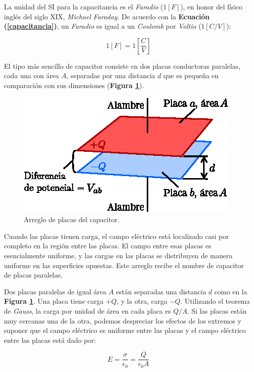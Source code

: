 \documentclass[letter,11pt]{article}
\begin{document}
La unidad del SI para la capacitancia es el \emph{Faradio} ($1 [F]$), en honor
del físico inglés del siglo XIX, \emph{Michael Faraday}. De acuerdo con la
\textbf{Ecuación (\ref{capacitancia})}, un \emph{Faradio} es igual a un
\emph{Coulomb} por \emph{Voltio} ($1 [C/V]$):

\begin{equation}
    1 [F] = 1 \left[\frac{C}{V}\right]
\label{faradio}
\end{equation}

El tipo más sencillo de capacitor consiste en dos placas conductoras paralelas,
cada una con área $A$, separadas por una distancia $d$ que es pequeña en
comparación con sus dimensiones (\textbf{Figura \ref{figura2}}).

\begin{figure}[!h]
\centering
\includegraphics[scale=1.20]{resources/f2.eps}
\caption{Arreglo de placas del capacitor.}
\label{figura2}
\end{figure}

Cuando las placas tienen carga, el campo eléctrico está localizado casi por
completo en la región entre las placas. El campo entre esas placas es
esencialmente uniforme, y las cargas en las placas se distribuyen de manera
uniforme en las superficies opuestas. Este arreglo recibe el nombre de capacitor
de placas paralelas.

Dos placas paralelas de igual área $A$ están separadas una distancia $d$ como en
la \textbf{Figura \ref{figura2}}. Una placa tiene carga $+Q$, y la otra, carga
$-Q$. Utilizando el teorema de \emph{Gauss}, la carga por unidad de área en cada
placa es $Q/A$. Si las placas están muy cercanas una de la otra, podemos
despreciar los efectos de los extremos y suponer que el campo eléctrico es
uniforme entre las placas y el campo eléctrico entre las placas está dado por:

\begin{equation}
    E = \frac{\sigma}{\epsilon_0} = \frac{Q}{\epsilon_0 A}
\label{campoelectrico}
\end{equation}
\end{document}
